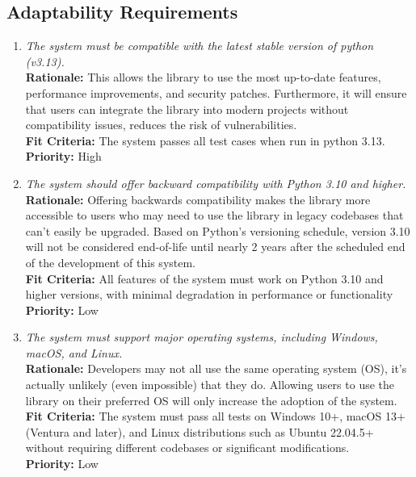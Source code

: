 \documentclass[12pt]{article}
\begin{document}
\subsection{Adaptability Requirements}
\begin{enumerate}[label=MS-AD \arabic*., wide=0pt, leftmargin=*]
  \item \emph{The system must be compatible with the latest stable
    version of python (v3.13).}\\
    {\bf Rationale:} This allows the library to use the most
    up-to-date features, performance improvements, and security
    patches. Furthermore, it will ensure that users can integrate the
    library into modern projects without compatibility issues,
    reduces the risk of vulnerabilities.\\
    {\bf Fit Criteria:} The system passes all test cases when run in
    python 3.13.\\
    {\bf Priority:} High

  \item \emph{The system should offer backward compatibility with
    Python 3.10 and higher.}\\
    {\bf Rationale:} Offering backwards compatibility makes the
    library more accessible to users who may need to use the library
    in legacy codebases that can't easily be upgraded. Based on
    Python's versioning schedule, version 3.10 will not be considered
    end-of-life until nearly 2 years after the scheduled end of the
    development of this system.\\
    {\bf Fit Criteria:} All features of the system must work on
    Python 3.10 and higher versions, with minimal degradation in
    performance or functionality\\
    {\bf Priority:} Low

  \item \emph{The system must support major operating systems,
    including Windows, macOS, and Linux.}\\
    {\bf Rationale:} Developers may not all use the same operating
    system (OS), it's actually unlikely (even impossible) that they
    do. Allowing users to use the library on their preferred OS will
    only increase the adoption of the system.\\
    {\bf Fit Criteria:} The system must pass all tests on Windows
    10+, macOS 13+ (Ventura and later), and Linux distributions such
    as Ubuntu 22.04.5+ without requiring different codebases or
    significant modifications.\\
    {\bf Priority:} Low


\end{enumerate}
\end{document}
